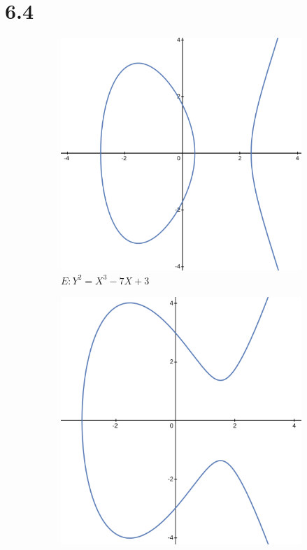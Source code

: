 \documentclass{article}
\begin{document}
\section*{6.4}
\begin{figure}[h!]
\begin{subfigure}[h]{0.3\linewidth}
  \includegraphics[width=\linewidth]{img/hw_12_1.png}
  \caption{$E: Y^2 = X^3 - 7X + 3$}
\end{subfigure}
\hfill
\begin{subfigure}[h]{0.3\linewidth}
  \includegraphics[width=\linewidth]{img/hw_12_2.png}

\end{subfigure}
\end{figure}
\end{document}
